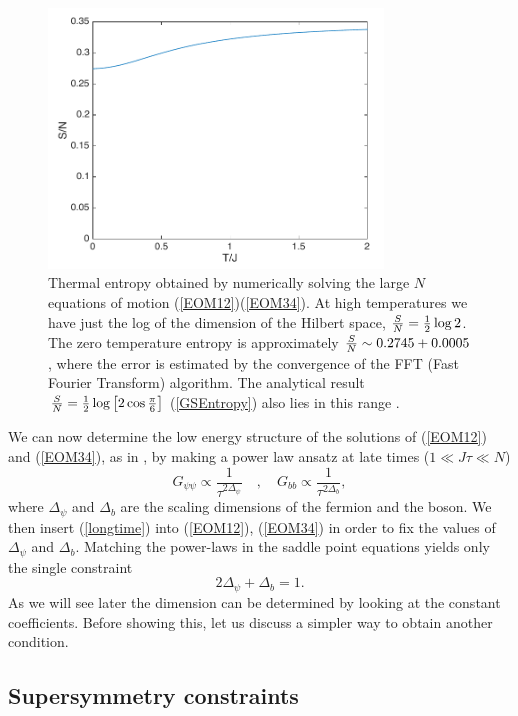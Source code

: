 \documentclass[aps,pre,preprint,onecolumn,citeautoscript,superscriptaddress,nofootinbib,eqsecnum]{revtex4-1}
\newcommand{\beq}{\begin{equation}}
\newcommand{\eeq}{\end{equation}}
\def\nref#1{(\ref{#1})}
\def\half{{1 \over 2 }}
\begin{document}
\begin{figure}[h]
\center
\includegraphics[width=3.5in]{Entropy.pdf}
\caption{Thermal entropy obtained by numerically  solving the large $N$ equations of motion \nref{EOM12}\nref{EOM34}.
 At high temperatures we have just the log of the dimension of the Hilbert space, 
${S \over N } = \half \log 2 $. The zero temperature entropy is approximately ${S \over N } \sim 0.2745+0.0005$, where the error is estimated by the convergence of the FFT (Fast Fourier Transform) algorithm. The analytical result $
 {S \over N } =\frac{1}{2}\log{\left[2\cos{\frac{\pi}{6}}\right]} $ \nref{GSEntropy} also lies in this range  .}
\label{Fig:Entropy}
\end{figure}
 

We can now  determine the low energy structure of the solutions of (\ref{EOM12}) and (\ref{EOM34}), as in 
 \cite{SY92}, by making a power law ansatz at late times  ($ 1 \ll J \tau \ll N $)
\beq
G_{\psi\psi} \propto \frac{1}{\tau^{2\Delta_{\psi}}} \quad , \quad G_{bb} \propto \frac{1}{\tau^{2\Delta_{b}}}, \label{longtime}
\eeq
where $\Delta_\psi$ and $\Delta_b$ are the scaling dimensions of the fermion and the boson.
We then insert (\ref{longtime}) into (\ref{EOM12}), (\ref{EOM34}) in order  to fix the values of $\Delta_\psi$ and $\Delta_b$.
Matching
the power-laws in the saddle point equations
  yields only  the single constraint
\beq
2\Delta_{\psi}+\Delta_b=1 .\label{scaling1}
\eeq
As we will see later the dimension can be determined by looking at the constant coefficients. Before showing this, let us discuss a simpler 
way to obtain another condition. 

\subsection{Supersymmetry constraints }
\end{document}
